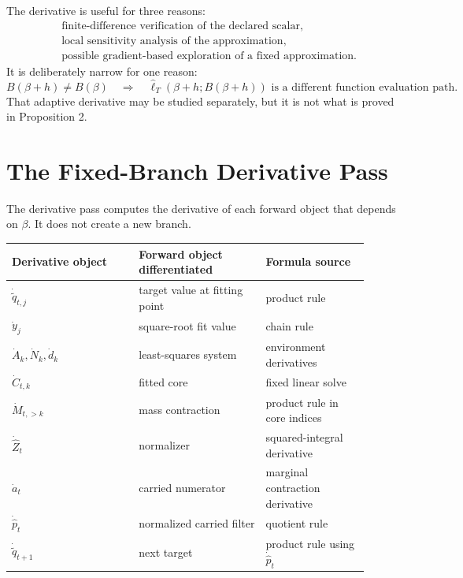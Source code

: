 \documentclass[11pt]{article}
\numberwithin{equation}{section}
\begin{document}
The derivative is useful for three reasons:
\begin{equation}
\begin{aligned}
&\text{finite-difference verification of the declared scalar},\\
&\text{local sensitivity analysis of the approximation},\\
&\text{possible gradient-based exploration of a fixed approximation}.
\end{aligned}
    \label{eq:p25-gradteach-10}
\end{equation}
It is deliberately narrow for one reason:
\begin{equation}
    B(\beta+h)\ne B(\beta)
    \quad\Rightarrow\quad
    \widehat\ell_T(\beta+h;B(\beta+h))
    \text{ is a different function evaluation path.}
    \label{eq:p25-gradteach-11}
\end{equation}
That adaptive derivative may be studied separately, but it is not what is
proved in Proposition 2.

\section{The Fixed-Branch Derivative Pass}

The derivative pass computes the derivative of each forward object that depends
on \(\beta\).  It does not create a new branch.

\begin{center}
\begin{tabular}{p{0.32\linewidth}p{0.32\linewidth}p{0.26\linewidth}}
\toprule
Derivative object & Forward object differentiated & Formula source\\
\midrule
\(\dot{\widetilde q}_{t,j}\) & target value at fitting point & product rule\\
\(\dot y_j\) & square-root fit value & chain rule\\
\(\dot A_k,\dot N_k,\dot d_k\) & least-squares system & environment derivatives\\
\(\dot C_{t,k}\) & fitted core & fixed linear solve\\
\(\dot M_{t,>k}\) & mass contraction & product rule in core indices\\
\(\dot{\widehat Z}_t\) & normalizer & squared-integral derivative\\
\(\dot a_t\) & carried numerator & marginal contraction derivative\\
\(\dot{\widehat p}_t\) & normalized carried filter & quotient rule\\
\(\dot{\widetilde q}_{t+1}\) & next target & product rule using \(\dot{\widehat p}_t\)\\
\bottomrule
\end{tabular}
\end{center}
\end{document}
